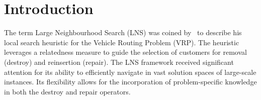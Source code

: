 \documentclass[3p, authoryear, times]{elsarticle}
\begin{document}
\newcommand{\np}{N_i^{+}}
\newcommand{\nminus}{N_i^{-}}
\newcommand{\Pf}{\mathcal{P}}
\newcommand{\Plin}{\widetilde{\mathcal{P}}}
\newcommand{\pij}{\rho_{ij}}

\newcommand{\binloss}{\mathcal{L}_B}
\newcommand{\ls}{\text{LS}^*}

\newcommand{\wa}{\omega_1}
\newcommand{\wb}{\omega_0}


\newcommand{\mlmodel}{\psi}
\newcommand{\trainedmlmodel}{\hat{\psi}}
\newcommand{\fit}{\text{fit}}
\newcommand{\featurizer}{\phi}
\newcommand{\labels}{\mathcal{Y}}

\newcommand{\lsa}{\mathcal{A}_{\text{LS}}}

\newcommand{\spla}{\mathbb{A}_{\text{SPL}}}
\newcommand{\splx}{\mathcal{X}}

\newcommand{\varname}[1]{\texttt{\detokenize{#1}}}

\newcommand{\refeq}[1]{(\ref{#1})}


\newcommand{\lgbma}{LGBMW1}
\newcommand{\lgbmb}{LGBMW-1}






\newcommand{\lns}{LNS}

\newcommand{\setbin}{\mathcal{B}}
\newcommand{\setint}{\mathcal{Q}}
\newcommand{\setcontinuous}{\mathcal{W}}
\newcommand{\lb}{l}
\newcommand{\ub}{u}



\newcommand{\xbbin}{\xb_{\setbin}}
\newcommand{\nsm}{\mathcal{N}}
\newcommand{\state}{\mathcal{S}}
\newcommand{\fixingratio}{r_{\nsm}}
\newcommand{\history}{h}

\newcommand{\keepset}{\mathcal{M}} %

\newcommand{\xblin}{\tilde{\xb}}
\newcommand{\xlin}{\tilde{x}}

\newcommand{\egreedy}{$\varepsilon\text{-greedy}$}
\newcommand{\ucb}{$\alpha\text{-UCB}$}


\newcommand{\xbar}{\bar{x}}
\newcommand{\xbbar}{\bar{\xb}}
\newcommand{\mw}{m_w}

\newcommand{\biga}{\mathcal{A}}
\newcommand{\bigd}{\mathcal{D}}


\section{Introduction}

The term Large Neighbourhood Search (LNS) was coined by~\cite{shaw_using_1998} to describe his local search heuristic for the Vehicle Routing Problem (VRP). The heuristic leverages a relatedness measure to guide the selection of customers for removal (destroy) and reinsertion (repair). The LNS framework received significant attention for its ability to efficiently navigate in vast solution spaces of large-scale instances. Its flexibility allows for the incorporation of problem-specific knowledge in both the destroy and repair operators. 
\end{document}
